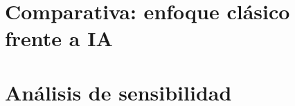 \section{Comparativa: enfoque clásico frente a IA}\label{sec:Comparativa}

\section{Análisis de sensibilidad}\label{sec:Sensibilidad}
